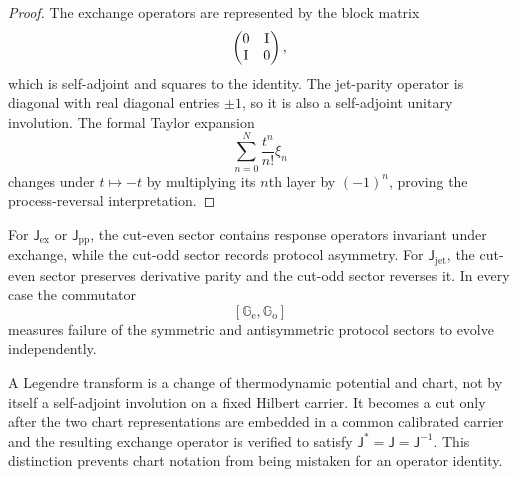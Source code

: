 \begin{proof}
The exchange operators are represented by the block matrix
\[
\begin{pmatrix}0&\mathrm I\\ \mathrm I&0\end{pmatrix},
\]
which is self-adjoint and squares to the identity.  The jet-parity operator is diagonal with real diagonal entries $\pm1$, so it is also a self-adjoint unitary involution.  The formal Taylor expansion
\[
\sum_{n=0}^N\frac{t^n}{n!}\xi_n
\]
changes under $t\mapsto-t$ by multiplying its $n$th layer by $(-1)^n$, proving the process-reversal interpretation.
\end{proof}

\begin{corollary}
For $\mathsf J_{\mathrm{ex}}$ or $\mathsf J_{\mathrm{pp}}$, the cut-even sector contains response operators invariant under exchange, while the cut-odd sector records protocol asymmetry.  For $\mathsf J_{\mathrm{jet}}$, the cut-even sector preserves derivative parity and the cut-odd sector reverses it.  In every case the commutator
\[
[\mathbb G_{\mathrm e},\mathbb G_{\mathrm o}]
\]
measures failure of the symmetric and antisymmetric protocol sectors to evolve independently.
\end{corollary}

\begin{remark}
A Legendre transform is a change of thermodynamic potential and chart, not by itself a self-adjoint involution on a fixed Hilbert carrier.  It becomes a cut only after the two chart representations are embedded in a common calibrated carrier and the resulting exchange operator is verified to satisfy $\mathsf J^*=\mathsf J=\mathsf J^{-1}$.  This distinction prevents chart notation from being mistaken for an operator identity.
\end{remark}
